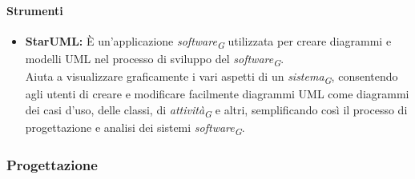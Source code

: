 \paragraph{Strumenti}
\begin{itemize}
    \item \textbf{StarUML:}
    È un'applicazione \textit{software}\textsubscript{\textit{G}} utilizzata per creare diagrammi e modelli UML nel processo di sviluppo del \textit{software}\textsubscript{\textit{G}}. \\
    Aiuta a visualizzare graficamente i vari aspetti di un \textit{sistema}\textsubscript{\textit{G}}, consentendo agli utenti di creare e modificare facilmente diagrammi UML come diagrammi dei casi d'uso, delle classi, di \textit{attività}\textsubscript{\textit{G}} e altri, semplificando così il processo di progettazione e analisi dei sistemi \textit{software}\textsubscript{\textit{G}}.
\end{itemize}

\subsubsection{Progettazione}

